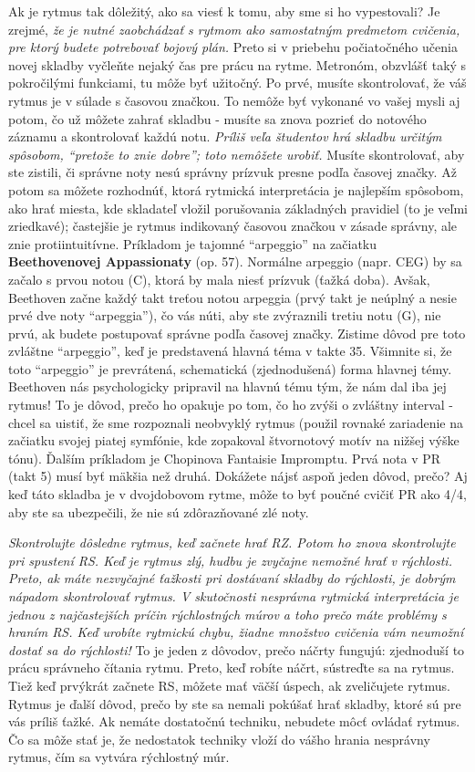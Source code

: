 Ak je rytmus tak dôležitý, ako sa viesť k tomu, aby sme si ho vypestovali? Je zrejmé, \emph{že je nutné zaobchádzať s rytmom ako samostatným predmetom cvičenia, pre ktorý budete potrebovať bojový plán.} Preto si v priebehu počiatočného učenia novej skladby vyčleňte nejaký čas pre prácu na rytme. Metronóm, obzvlášť taký s pokročilými funkciami, tu môže byť užitočný. Po prvé, musíte skontrolovať, že váš rytmus je v súlade s časovou značkou. To nemôže byť vykonané vo vašej mysli aj potom, čo už môžete zahrať skladbu - musíte sa znova pozrieť do notového záznamu a skontrolovať každú notu. \emph{Príliš veľa študentov hrá skladbu určitým spôsobom, “pretože to znie dobre”; toto nemôžete urobiť.} Musíte skontrolovať, aby ste zistili, či správne noty nesú správny prízvuk presne podľa časovej značky. Až potom sa môžete rozhodnúť, ktorá rytmická interpretácia je najlepším spôsobom, ako hrať miesta, kde skladateľ vložil porušovania základných pravidiel (to je veľmi zriedkavé); častejšie je rytmus indikovaný časovou značkou v zásade správny, ale znie protiintuitívne. Príkladom je tajomné “arpeggio” na začiatku \textbf{Beethovenovej Appassionaty} (op. 57). Normálne arpeggio (napr. CEG) by sa začalo s prvou notou (C), ktorá by mala niesť prízvuk (ťažká doba). Avšak, Beethoven začne každý takt treťou notou arpeggia (prvý takt je neúplný a nesie prvé dve noty “arpeggia”), čo vás núti, aby ste zvýraznili tretiu notu (G), nie prvú, ak budete postupovať správne podľa časovej značky. Zistime dôvod pre toto zvláštne “arpeggio”, keď je predstavená hlavná téma v takte 35. Všimnite si, že toto “arpeggio” je prevrátená, schematická (zjednodušená) forma hlavnej témy. Beethoven nás psychologicky pripravil na hlavnú tému tým, že nám dal iba jej rytmus! To je dôvod, prečo ho opakuje po tom, čo ho zvýši o zvláštny interval - chcel sa uistiť, že sme rozpoznali neobvyklý rytmus (použil rovnaké zariadenie na začiatku svojej piatej symfónie, kde zopakoval štvornotový motív na nižšej výške tónu). Ďalším príkladom je Chopinova Fantaisie Impromptu. Prvá nota v PR (takt 5) musí byť mäkšia než druhá. Dokážete nájsť aspoň jeden dôvod, prečo? Aj keď táto skladba je v dvojdobovom rytme, môže to byť poučné cvičiť PR ako 4/4, aby ste sa ubezpečili, že nie sú zdôrazňované zlé noty.

\emph{Skontrolujte dôsledne rytmus, keď začnete hrať RZ. Potom ho znova skontrolujte pri spustení RS. Keď je rytmus zlý, hudbu je zvyčajne nemožné hrať v rýchlosti. Preto, ak máte nezvyčajné ťažkosti pri dostávaní skladby do rýchlosti, je dobrým nápadom skontrolovať rytmus. V skutočnosti nesprávna rytmická interpretácia je jednou z najčastejších príčin rýchlostných múrov a toho prečo máte problémy s hraním RS. Keď urobíte rytmickú chybu, žiadne množstvo cvičenia vám neumožní dostať sa do rýchlosti!} To je jeden z dôvodov, prečo náčrty fungujú: zjednoduší to prácu správneho čítania rytmu. Preto, keď robíte náčrt, sústreďte sa na rytmus. Tiež keď prvýkrát začnete RS, môžete mať väčší úspech, ak zveličujete rytmus. Rytmus je ďalší dôvod, prečo by ste sa nemali pokúšať hrať skladby, ktoré sú pre vás príliš ťažké. Ak nemáte dostatočnú techniku, nebudete môcť ovládať rytmus. Čo sa môže stať je, že nedostatok techniky vloží do vášho hrania nesprávny rytmus, čím sa vytvára rýchlostný múr.

